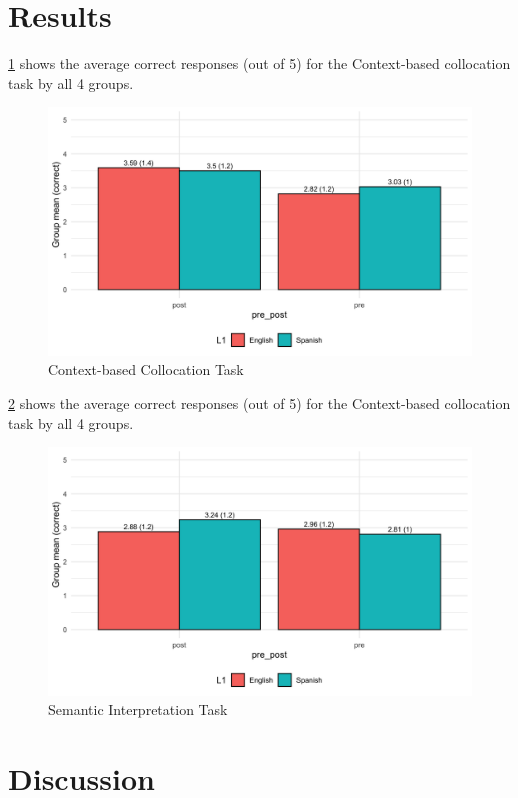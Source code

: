 \documentclass[
  man]{apa6}
\begin{document}
\hypertarget{results}{%
\section{Results}\label{results}}

\ref{fig:cmc-desc} shows the average correct responses (out of 5) for the Context-based collocation task by all 4 groups.

\begin{figure}
\includegraphics[width=7in]{figs/cbc_desc} \caption{Context-based Collocation Task}\label{fig:cmc-desc}
\end{figure}

\ref{fig:sem-desc} shows the average correct responses (out of 5) for the Context-based collocation task by all 4 groups.

\begin{figure}
\includegraphics[width=7in]{figs/semantic_desc} \caption{Semantic Interpretation Task}\label{fig:sem-desc}
\end{figure}

\hypertarget{discussion}{%
\section{Discussion}\label{discussion}}
\end{document}
